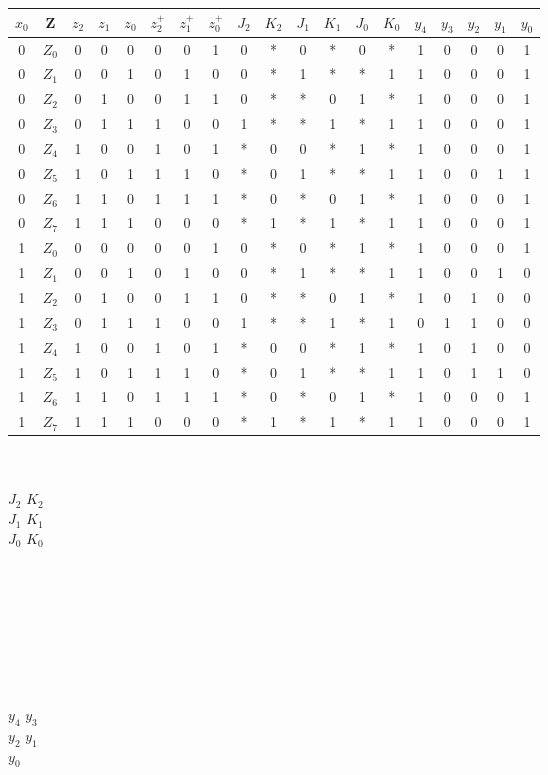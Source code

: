 \documentclass[11pt,a4paper]{article}
\begin{document}
\begin{tabular}{c | c | c | c | c | | c | c | c | | c | c | c | c | c | c | | c | c | c | c | c}
$x_0$&Z&$z_2$&$z_1$&$z_0$&$z^+_2$&$z^+_1$&$z^+_0$&$J_2$&$K_2$&$J_1$&$K_1$&$J_0$&$K_0$&$y_4$&$y_3$&$y_2$&$y_1$&$y_0$ \\ \hline
0&$Z_0$&0&0&0&0&0&1&0&*&0&*&0&*&1&0&0&0&1\\
0&$Z_1$&0&0&1&0&1&0&0&*&1&*&*&1&1&0&0&0&1\\
0&$Z_2$&0&1&0&0&1&1&0&*&*&0&1&*&1&0&0&0&1\\
0&$Z_3$&0&1&1&1&0&0&1&*&*&1&*&1&1&0&0&0&1\\
0&$Z_4$&1&0&0&1&0&1&*&0&0&*&1&*&1&0&0&0&1\\
0&$Z_5$&1&0&1&1&1&0&*&0&1&*&*&1&1&0&0&1&1\\
0&$Z_6$&1&1&0&1&1&1&*&0&*&0&1&*&1&0&0&0&1\\
0&$Z_7$&1&1&1&0&0&0&*&1&*&1&*&1&1&0&0&0&1\\ \hline
1&$Z_0$&0&0&0&0&0&1&0&*&0&*&1&*&1&0&0&0&1\\
1&$Z_1$&0&0&1&0&1&0&0&*&1&*&*&1&1&0&0&1&0\\
1&$Z_2$&0&1&0&0&1&1&0&*&*&0&1&*&1&0&1&0&0\\
1&$Z_3$&0&1&1&1&0&0&1&*&*&1&*&1&0&1&1&0&0\\
1&$Z_4$&1&0&0&1&0&1&*&0&0&*&1&*&1&0&1&0&0\\
1&$Z_5$&1&0&1&1&1&0&*&0&1&*&*&1&1&0&1&1&0\\
1&$Z_6$&1&1&0&1&1&1&*&0&*&0&1&*&1&0&0&0&1\\
1&$Z_7$&1&1&1&0&0&0&*&1&*&1&*&1&1&0&0&0&1\\
\end{tabular}\\ \\
$J_2$ 
 $K_2$
\\
$J_1$
$K_1$
\\
$J_0$
$K_0$
 \\ \\ \\ \\ \\ \\ \\ \\ \\
$y_4$
$y_3$
\\
$y_2$
$y_1$
\\
$y_0$
\\
\end{document}
